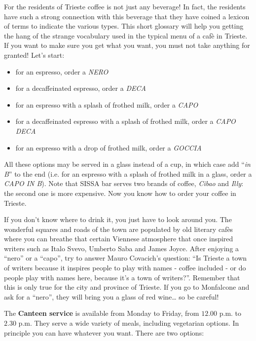 \documentclass{sissavademecum}
\begin{document}
For the residents of Trieste coffee is not just any beverage! In fact, the residents have such a strong connection with this beverage that they have coined a lexicon of terms to indicate the various types. This short glossary will help you getting the hang of the strange vocabulary used in the typical menu of a caf\`e in Trieste. If you want to make sure you get what you want, you must not take anything for granted! Let's start:

\begin{itemize}
    \item for an espresso, order a \textit{NERO}
    \item for a decaffeinated espresso, order a \textit{DECA}
    \item for an espresso with a splash of frothed milk, order a \textit{CAPO}
    \item for a decaffeinated espresso with a splash of frothed milk, order a \textit{CAPO DECA}
    \item for an espresso with a drop of frothed milk, order a \textit{GOCCIA}
\end{itemize}

All these options may be served in a glass instead of a cup, in which case add ``\textit{in B}{}'' to the end (i.e. for an espresso with a splash of frothed milk in a glass, order a \textit{CAPO IN B}). Note that SISSA bar serves two brands of coffee, \textit{Cibao} and \textit{Illy}: the second one is more expensive. Now you know how to order your coffee in Trieste. 

If you don't know where to drink it, you just have to look around you. The wonderful squares and roads of the town are populated by old literary caf\`es where you can breathe that certain Viennese atmosphere that once inspired writers such as Italo Svevo, Umberto Saba and James Joyce. After enjoying a ``nero'' or a ``capo'', try to answer Mauro Covacich's question: ``Is Trieste a town of writers because it inspires people to play with names - coffee included - or do people play with names here, because it's a town of writers?''. Remember that this is only true for the city and province of Trieste. If you go to Monfalcone and ask for a ``nero'', they will bring you a glass of red wine{\dots} so be careful!


The \textbf{Canteen service} is available from Monday to Friday, from $12.00$ p.m. to $2.30$ p.m. They serve a wide variety of meals, including vegetarian options. In principle you can have whatever you want. There are two options:
\end{document}
